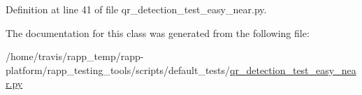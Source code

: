 Definition at line 41 of file qr\-\_\-detection\-\_\-test\-\_\-easy\-\_\-near.\-py.



The documentation for this class was generated from the following file\-:\begin{DoxyCompactItemize}
\item 
/home/travis/rapp\-\_\-temp/rapp-\/platform/rapp\-\_\-testing\-\_\-tools/scripts/default\-\_\-tests/\hyperlink{qr__detection__test__easy__near_8py}{qr\-\_\-detection\-\_\-test\-\_\-easy\-\_\-near.\-py}\end{DoxyCompactItemize}
